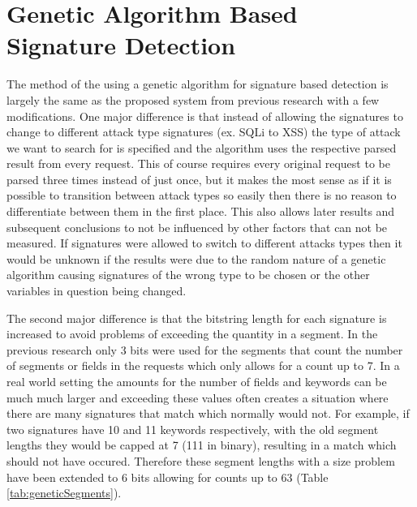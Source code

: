 \section{Genetic Algorithm Based Signature Detection}\label{sec:genIntro}

The method of the using a genetic algorithm for signature based detection is largely the same as the proposed system from previous research with a few modifications. \cite{mainPaper}  One major difference is that instead of allowing the signatures to change to different attack type signatures (ex. SQLi to XSS) the type of attack we want to search for is specified and the algorithm uses the respective parsed result from every request.  This of course requires every original request to be parsed three times instead of just once, but it makes the most sense as if it is possible to transition between attack types so easily then there is no reason to differentiate between them in the first place.  This also allows later results and subsequent conclusions to not be influenced by other factors that can not be measured.  If signatures were allowed to switch to different attacks types then it would be unknown if the results were due to the random nature of a genetic algorithm causing signatures of the wrong type to be chosen or the other variables in question being changed.  

The second major difference is that the bitstring length for each signature is increased to avoid problems of exceeding the quantity in a segment.  In the previous research only 3 bits were used for the segments that count the number of segments or fields in the requests which only allows for a count up to 7.  In a real world setting the amounts for the number of fields and keywords can be much much larger and exceeding these values often creates a situation where there are many signatures that match which normally would not.  For example, if two signatures have 10 and 11 keywords respectively, with the old segment lengths they would be capped at 7  (111 in binary), resulting in a match which should not have occured.  Therefore these segment lengths with a size problem have been extended to 6 bits allowing for counts up to 63 (Table \ref{tab:geneticSegments}).

